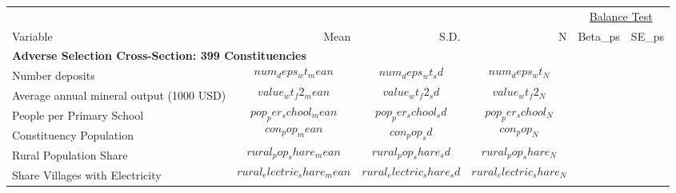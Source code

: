 \begin{tabular}{l r r r r r}\hline\hline

           &      &      &   & \multicolumn{2}{c}{\underline{Balance Test}} \\ 
  Variable & Mean & S.D. & N & Beta_{ps} & SE_{ps}  \\ \hline

\multicolumn{6}{l}{\textbf{Adverse Selection Cross-Section: 399 Constituencies}} \\
\quad Number deposits                          & $$num_deps_wt_mean$$          & $$num_deps_wt_sd$$          & $$num_deps_wt_N$$          &  & \\
\quad Average annual mineral output (1000 USD) & $$value_wt_f2_mean$$          & $$value_wt_f2_sd$$          & $$value_wt_f2_N$$          &  & \\
\quad People per Primary School                & $$pop_per_school_mean$$       & $$pop_per_school_sd$$       & $$pop_per_school_N$$       &  & \\
\quad Constituency Population                  & $$con_pop_mean$$              & $$con_pop_sd$$              & $$con_pop_N$$              &  & \\
\quad Rural Population Share                   & $$rural_pop_share_mean$$      & $$rural_pop_share_sd$$      & $$rural_pop_share_N$$      &  & \\
\quad Share Villages with Electricity          & $$rural_electric_share_mean$$ & $$rural_electric_share_sd$$ & $$rural_electric_share_N$$ &  & \\


\end{tabular}
